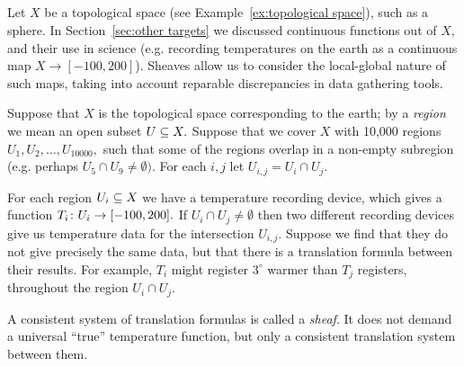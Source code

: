 \documentclass[CT4S-EN-RU]{subfiles}
\begin{document}
\begin{applicationRUS}
\end{applicationRUS}


\subsection{}\label{sec:sheaves}

\begin{blockENG}
Let $X$ be a topological space (see Example~\ref{ex:topological space}), such as a sphere. In Section~\ref{sec:other targets} we discussed continuous functions out of $X,$ and their use in science (e.g. recording temperatures on the earth as a continuous map $X\to[-100,200]$). Sheaves allow us to consider the local-global nature of such maps, taking into account reparable discrepancies in data gathering tools. 
\end{blockENG}

\begin{blockRUS}
\end{blockRUS}

\begin{applicationENG}\label{app:sheaves of temperature}
Suppose that $X$ is the topological space corresponding to the earth; by a {\em region} we mean an open subset $U\ss X.$ Suppose that we cover $X$ with 10,000 regions $U_1,U_2,\ldots,U_{10000},$ such that some of the regions overlap in a non-empty subregion (e.g. perhaps $U_5\cap U_9\neq\emptyset).$ For each $i,j$ let $U_{i,j}=U_i\cap U_j.$ 

For each region $U_i\ss X$ we have a temperature recording device, which gives a function $T_i\taking U_i\to[-100,200].$ If $U_i\cap U_j\neq\emptyset$ then two different recording devices give us temperature data for the intersection $U_{i,j}.$ Suppose we find that they do not give precisely the same data, but that there is a translation formula between their results. For example, $T_i$ might register $3^\circ$ warmer than $T_j$ registers, throughout the region $U_i\cap U_j.$

A consistent system of translation formulas is called a {\em sheaf}. It does not demand a universal “true” temperature function, but only a consistent translation system between them. 
\end{applicationENG}

\begin{applicationRUS}\label{app:sheaves of temperature}
\end{applicationRUS}
\end{document}
